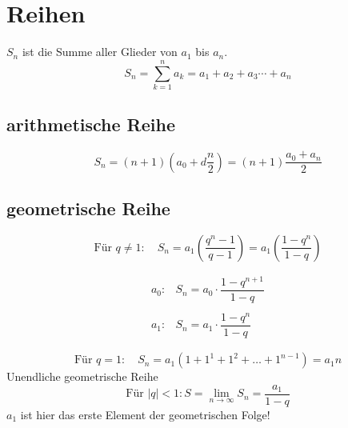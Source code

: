 



\section{Reihen}
$S_n$ ist die Summe aller Glieder von $a_1$ bis $a_n$. 
\[ \boxed{S_n = \sum_{k=1}^{n} a_k = a_1 + a_2 + a_3 \cdots + a_n} \]

\subsection{arithmetische Reihe}
\[ \boxed{S_n = \left(n + 1\right)\left(a_0 + d \frac{n}{2}\right) = \left(n + 1\right) \frac{a_0 + a_n}{2}} \]

\subsection{geometrische Reihe}
\[ \boxed{\text{Für } q \neq 1: \quad S_n = a_1 \left(  \frac{q^n - 1}{q - 1} \right) = a_1 \left(  \frac{1 - q^n}{1 - q} \right)} \]

\[ \boxed{\begin{array}{ll}
a_0 :& S_n = a_0 \cdot \dfrac{1-q^{n+1}}{1-q} \\ 
& \\
a_1 :& S_n = a_1 \cdot \dfrac{1-q^n}{1-q}
\end{array}} \]

\[ \boxed{\text{Für } q = 1: \quad S_n = a_1 \left(1+1^1 + 1^2 + \ldots + 1^{n-1}\right) = a_1 n} \]
Unendliche geometrische Reihe
\[ \boxed{\text{Für } |q| < 1: S = \lim_{n \rightarrow \infty} S_n = \frac{a_1}{1 - q}} \] 
$a_1$ ist hier das erste Element der geometrischen Folge!

